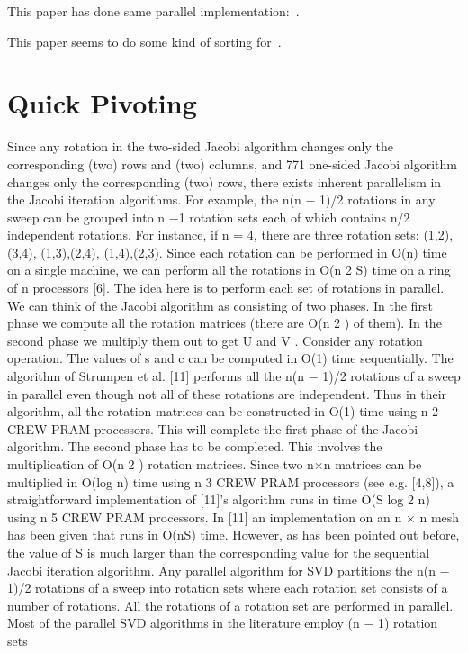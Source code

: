 \documentclass[10pt, conference, compsocconf]{IEEEtran}
\begin{document}
This paper has done same parallel implementation:~\cite{soliman2008memory}.

This paper seems to do some kind of sorting for~\cite{zhou1995parallel}.

\section{Quick Pivoting}
Since any rotation in the two-sided Jacobi algorithm changes
only the corresponding (two) rows and (two) columns, and
771
one-sided Jacobi algorithm changes only the corresponding
(two) rows, there exists inherent parallelism in the Jacobi
iteration algorithms. For example, the n(n − 1)/2 rotations in
any sweep can be grouped into n −1 rotation sets each of which
contains n/2 independent rotations. For instance, if n = 4, there
are three rotation sets: {(1,2),(3,4)}, {(1,3),(2,4)}, {(1,4),(2,3)}.
Since each rotation can be performed in O(n) time on a single
machine, we can perform all the rotations in O(n 2 S) time on a
ring of n processors [6]. The idea here is to perform each set of
rotations in parallel.
We can think of the Jacobi algorithm as consisting of two
phases. In the first phase we compute all the rotation matrices
(there are O(n 2 ) of them). In the second phase we multiply
them out to get U and V . Consider any rotation operation. The
values of s and c can be computed in O(1) time sequentially.
The algorithm of Strumpen et al. [11] performs all the n(n −
1)/2 rotations of a sweep in parallel even though not all of
these rotations are independent. Thus in their algorithm, all
the rotation matrices can be constructed in O(1) time using
n 2 CREW PRAM processors. This will complete the first
phase of the Jacobi algorithm. The second phase has to be
completed. This involves the multiplication of O(n 2 ) rotation
matrices. Since two n×n matrices can be multiplied in O(log n)
time using n 3 CREW PRAM processors (see e.g. [4,8]), a
straightforward implementation of [11]’s algorithm runs in time
O(S log 2 n) using n 5 CREW PRAM processors. In [11] an
implementation on an n × n mesh has been given that runs
in O(nS) time. However, as has been pointed out before, the
value of S is much larger than the corresponding value for the
sequential Jacobi iteration algorithm.
Any parallel algorithm for SVD partitions the n(n − 1)/2
rotations of a sweep into rotation sets where each rotation
set consists of a number of rotations. All the rotations of a
rotation set are performed in parallel. Most of the parallel
SVD algorithms in the literature employ (n − 1) rotation sets
\end{document}

